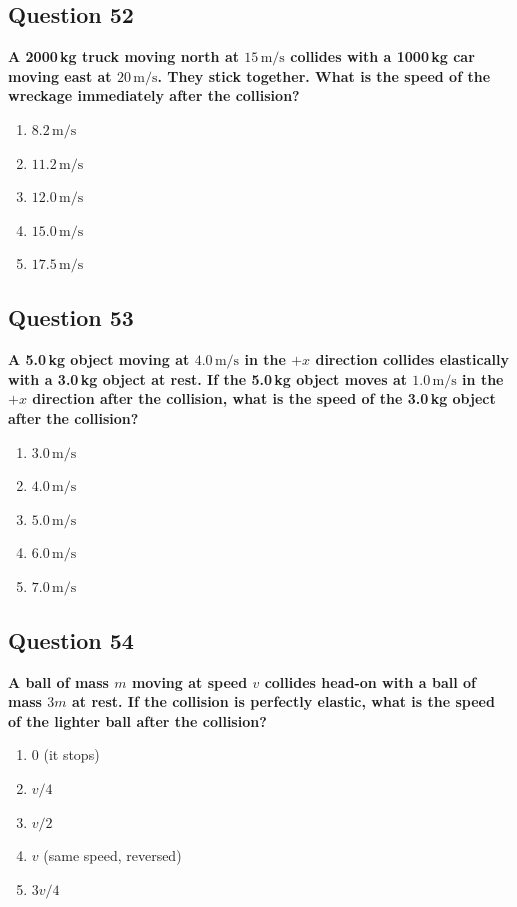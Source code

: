 \documentclass[12pt,letterpaper]{article}
\begin{document}
\subsection{Question 52}

\begin{questionbox}
\textbf{A 2000\,kg truck moving north at $15\,\text{m/s}$ collides with a 1000\,kg car moving east at $20\,\text{m/s}$. They stick together. What is the speed of the wreckage immediately after the collision?}

\begin{enumerate}[label=\alph*)]
    \item $8.2\,\text{m/s}$
    \item $11.2\,\text{m/s}$
    \item $12.0\,\text{m/s}$
    \item $15.0\,\text{m/s}$
    \item $17.5\,\text{m/s}$
\end{enumerate}
\end{questionbox}

\subsection{Question 53}

\begin{questionbox}
\textbf{A 5.0\,kg object moving at $4.0\,\text{m/s}$ in the $+x$ direction collides elastically with a 3.0\,kg object at rest. If the 5.0\,kg object moves at $1.0\,\text{m/s}$ in the $+x$ direction after the collision, what is the speed of the 3.0\,kg object after the collision?}

\begin{enumerate}[label=\alph*)]
    \item $3.0\,\text{m/s}$
    \item $4.0\,\text{m/s}$
    \item $5.0\,\text{m/s}$
    \item $6.0\,\text{m/s}$
    \item $7.0\,\text{m/s}$
\end{enumerate}
\end{questionbox}

\subsection{Question 54}

\begin{questionbox}
\textbf{A ball of mass $m$ moving at speed $v$ collides head-on with a ball of mass $3m$ at rest. If the collision is perfectly elastic, what is the speed of the lighter ball after the collision?}

\begin{enumerate}[label=\alph*)]
    \item $0$ (it stops)
    \item $v/4$
    \item $v/2$
    \item $v$ (same speed, reversed)
    \item $3v/4$
\end{enumerate}
\end{questionbox}
\end{document}
